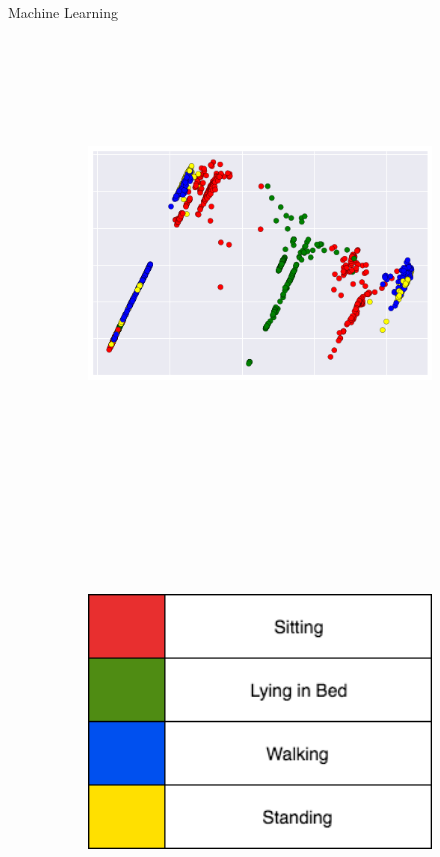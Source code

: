 \documentclass[22pt]{beamer}
\begin{document}
\begin{frame}[fragile]
\begin{textblock}{7.25}
\begin{block}{Machine Learning}
\begin{figure}
\begin{subfigure}{1.0\textwidth}
\centerline{
\includegraphics[height=12cm, width=18cm, valign=t]{pca.png}
\hspace{7cm}
\includegraphics[height=12cm, width=18cm, valign=t]{Chart.png}}
\end{subfigure}


\end{figure}
\end{block}
\end{textblock}
\end{frame}
\end{document}
